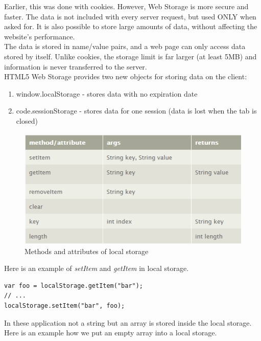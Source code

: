 Earlier, this was done with cookies. However, Web Storage is more secure and faster. The data is not included with every server request, but used ONLY when asked for. It is also possible to store large amounts of data, without affecting the website's performance.\cite{w3school}
\\

The data is stored in name/value pairs, and a web page can only access data stored by itself. Unlike cookies, the storage limit is far larger (at least 5MB) and information is never transferred to the server.\cite{w3school}
\\

HTML5 Web Storage provides two new objects for storing data on the client:
\begin{enumerate}
\item window.localStorage - stores data with no expiration date\cite{w3school}
\item code.sessionStorage - stores data for one session (data is lost when the tab is closed)\cite{w3school}
\end{enumerate}


\begin{figure}[h]
\centering
\includegraphics[width=0.9\linewidth]{graphics/chapter4/20}
\caption{Methods and attributes of local storage\cite{localstorageapi}}
\end{figure}


Here is an example of \textit{setItem} and \textit{getItem} in local storage.
\\

\begin{lstlisting}[language=html, caption= 
setItem example (Adapted from \cite{localstorageexample}),captionpos=b]
var foo = localStorage.getItem("bar");
// ...
localStorage.setItem("bar", foo);
\end{lstlisting}

In these application not a string but an array is stored inside the local storage. Here is an example how we put an empty array into a local storage.
\\

